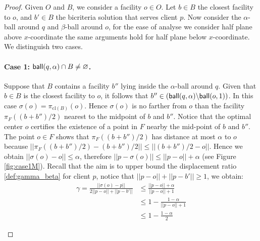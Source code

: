 \documentclass[11pt]{article}
\newcommand{\ball}{{\sf ball}}
\begin{document}
\begin{proof}
Given $O$ and $B$, we consider a facility $o \in O$. Let $b\in B$  the closest facility to $o$, and $b'\in B$  the bicriteria solution that serves client $p$.  Now consider the $\alpha$-ball around $q$ and $\beta$-ball around $o$, for the ease of analyse we consider half plane above $x$-coordinate the same arguments hold for half plane below $x$-coordinate. We distinguish two cases.

\paragraph*{Case 1: $\ball(q, \alpha) \cap B \neq \varnothing$.} Suppose that $B$ contains a facility $b''$ lying inside the $\alpha$-ball around $q$.  Given that  $b\in B$ is the closest facility to $o$, it follows that $b''\in(\ball(q,\alpha)\backslash \ball(o, 1))$. In this case $\sigma(o)=\pi_{\text{cl}(B)}(o)$. Hence $\sigma(o)$ is no farther from $o$ than the facility $\pi_F((b+b'')/2)$ nearest to the midpoint of $b$ and $b''$.  Notice that the optimal center $o$ certifies the existence of a point in $F$ nearby the mid-point of $b$ and $b''$. The point $o\in F$ shows that $\pi_{F}((b+b'')/2)$ has distance at most $\alpha$ to $o$ because $||\pi_{F}((b+b'')/2)-(b+b'')/2||\leq ||(b+b'')/2-o||$. Hence we obtain $||\sigma(o)-o|| \leq \alpha$, therefore $ ||p-\sigma(o)|| \leq ||p-o||+ \alpha$ (see Figure \ref{fig:case1M}). Recall that the aim is to upper bound the displacement ratio \ref{def:gamma_beta} for client $p$, notice that $||p-o||+||p-b'|| \geq 1$, we obtain:
\begin{equation*}
     \begin{split}
     \gamma=\frac{||\sigma(o)-p||}{2||p-o|| + ||p-b'||} & \leq \frac{||p-o||+\alpha}{||p-o||+1}\\
     &\leq 1 - \frac{1-\alpha}{||p-o||+1}\\
     &\leq 1- \frac{1-\alpha}{2}
     \end{split}
\end{equation*}     

\begin{figure}[h]

\newcommand{\tikzI}{
\begin{tikzpicture}
    \draw[color=black,  dashed, thick](0,0) circle (2);
    \draw[color=blue!60, inner color=white, thin](0,0) circle (0.5);
    \filldraw[black] (0,0) circle (1pt) node[anchor=south ]{\small $o$};
    \draw[black, thin] (0,0) -- (2,0) ;
    

\end{tikzpicture}}
\end{figure}
\end{proof}
\end{document}
